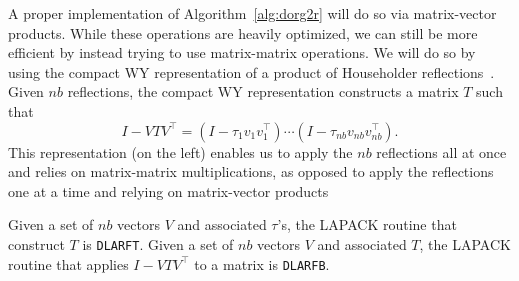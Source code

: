 \documentclass[12pt]{article}
\begin{document}
    A proper implementation of Algorithm~\ref{alg:dorg2r} will do so via matrix-vector products. While these operations
    are heavily optimized, we can still be more efficient by instead trying to use matrix-matrix
    operations. We will do so by using the compact WY representation of a product of Householder reflections~\cite{doi:10.1137/0910005}.
    Given $nb$ reflections, 
    the compact WY representation constructs a matrix $T$ such that 
    \[
        I - VTV^\top = \left(I - \tau_1 v_1v_1^\top\right)\cdots\left(I - \tau_{nb}v_{nb}v_{nb}^\top\right).
    \]
    This representation (on the left) enables us to apply the $nb$ reflections all at once and relies on matrix-matrix multiplications, 
    as opposed to apply the reflections one at a time and relying on matrix-vector products

    Given a set of $nb$ vectors $V$ and associated $\tau$'s, the LAPACK routine that construct $T$ is \verb|DLARFT|.
    Given a set of $nb$ vectors $V$ and associated $T$, the LAPACK routine that applies $I - VTV^\top$ to a matrix is \verb|DLARFB|.
\end{document}
